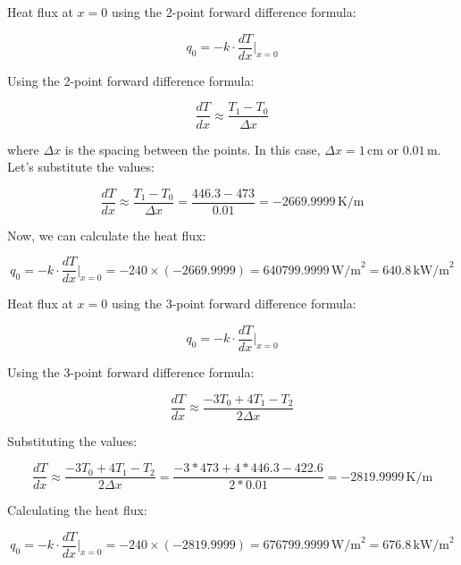 \documentclass[12pt, a4paper]{article}
\numberwithin{equation}{section}
\begin{document}
\\
\\

Heat flux at \(x = 0\) using the 2-point forward difference formula:

\begin{equation}
q_0 = -k \cdot \frac{d T}{d x}\Bigg|_{x=0}
\end{equation}

Using the 2-point forward difference formula:

\begin{equation}
\frac{d T}{d x} \approx \frac{T_1 - T_0}{\Delta x}
\end{equation}

where \(\Delta x\) is the spacing between the points. In this case, \(\Delta x = 1\, \text{cm}\) or \(0.01\, \text{m}\). Let's substitute the values:

\begin{equation}
\frac{dT}{dx} \approx \frac{T_1 - T_0}{\Delta x} = \frac{446.3 - 473}{0.01} = -2669.9999\, \text{K/m}
\end{equation}

Now, we can calculate the heat flux:

\begin{equation}
q_0 = -k \cdot \frac{dT}{dx}\Bigg|_{x=0} = -240 \times (-2669.9999) = 640799.9999\, \text{W/m}^2 = 640.8\, \text{kW/m}^2
\end{equation}

Heat flux at \(x = 0\) using the 3-point forward difference formula:

\begin{equation}
q_0 = -k \cdot \frac{d T}{d x}\Bigg|_{x=0}
\end{equation}

Using the 3-point forward difference formula:

\begin{equation}
\frac{d T}{d x} \approx \frac{-3T_0 + 4T_1 - T_2}{2\Delta x}
\end{equation}

Substituting the values:

\begin{equation}
\frac{dT}{dx} \approx \frac{-3T_0 + 4T_1 - T_2}{2\Delta x} = \frac{-3*473 + 4*446.3 - 422.6}{2*0.01} = -2819.9999\, \text{K/m}
\end{equation}

Calculating the heat flux:

\begin{equation}
q_0 = -k \cdot \frac{dT}{dx}\Bigg|_{x=0} = -240 \times (-2819.9999) = 676799.9999\, \text{W/m}^2 = 676.8\, \text{kW/m}^2
\end{equation}
\end{document}
